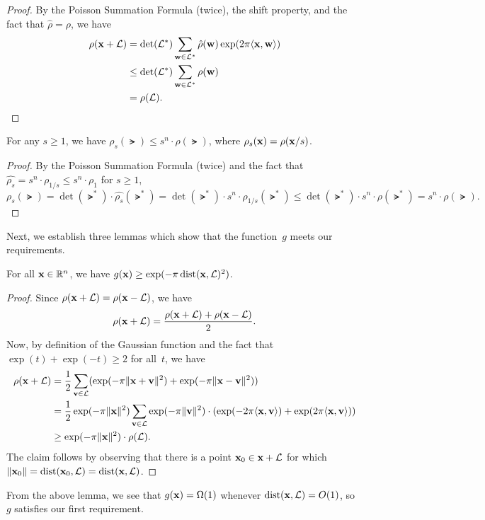 \documentclass[11pt]{article}
\begin{document}
\begin{proof}
  By the Poisson Summation Formula (twice), the shift property, and
  the fact that $\hat{\rho} = \rho$, we have
  \begin{align*}
    \rho(\mathbf{x} + \mathcal{L})
    &= \det(\mathcal{L}^*) \sum_{\mathbf{w} \in \mathcal{L}^*} \hat{\rho}(\mathbf{w})\exp(2 \pi \langle\mathbf{x},\mathbf{w}\rangle ) \\
    &\leq   \det(\mathcal{L}^*)\sum_{\mathbf{w} \in \mathcal{L}^*} \rho(\mathbf{w}) \\
    &=  \rho(\mathcal{L}).
  \end{align*}
\end{proof}

\begin{claim}
  \label{clm:gaussian-scale}
  For any $s \geq 1$, we have
  $\rho_s(\lat) \leq s^{n} \cdot \rho(\lat)$, where
  $\rho_s(\mathbf{x}) = \rho(\mathbf{x}/s)$.
\end{claim}

\begin{proof}
  By the Poisson Summation Formula (twice) and the fact that
  $\widehat{\rho_{s}} = s^{n} \cdot \rho_{1/s} \leq s^{n} \cdot
  \rho_{1}$ for $s \geq 1$,
  \[ \rho_s(\lat) = \det(\lat^*) \cdot \widehat{\rho_{s}}(\lat^*) =
    \det(\lat^{*}) \cdot s^{n} \cdot \rho_{1/s}(\lat^{*}) \leq
    \det(\lat^{*}) \cdot s^{n} \cdot \rho(\lat^{*}) = s^{n} \cdot
    \rho(\lat). \]
\end{proof}

\noindent Next, we establish three lemmas which show that the
function~$g$ meets our requirements.

\begin{lemma}
  For all $\mathbf{x} \in \mathbb{R}^{n}$, we have
  $g(\mathbf{x}) \geq \exp(-\pi \operatorname{dist}(\mathbf{x},\mathcal{L})^2)$.
\end{lemma}

\begin{proof}
  Since $\rho(\mathbf{x}+\mathcal{L}) = \rho(\mathbf{x}-\mathcal{L})$, we have
  \[ \rho(\mathbf{x}+\mathcal{L}) = \frac{\rho(\mathbf{x}+\mathcal{L}) +
      \rho(\mathbf{x}-\mathcal{L})}{2}. \] Now, by definition of the Gaussian
  function and the fact that $\exp(t) + \exp(-t) \geq 2$ for all~$t$,
  we have
  \begin{align*}
    \rho(\mathbf{x}+\mathcal{L})
    &= \frac12 \sum_{\mathbf{v} \in \mathcal{L}} ( \exp(-\pi \lVert\mathbf{x}+\mathbf{v}\rVert^2)+ \exp(-\pi \lVert\mathbf{x}-\mathbf{v}\rVert^2)) \\
    &= \frac12 \exp(-\pi \lVert\mathbf{x}\rVert^2)
      \sum_{\mathbf{v} \in \mathcal{L}} \exp(-\pi \lVert\mathbf{v}\rVert^2) \cdot
      (\exp(-2\pi \langle\mathbf{x},\mathbf{v}\rangle)+\exp(2\pi \langle\mathbf{x},\mathbf{v}\rangle)) \\
    &\geq \exp(-\pi \lVert\mathbf{x}\rVert^{2}) \cdot \rho(\mathcal{L}) .
  \end{align*}
  The claim follows by observing that there is a point
  $\mathbf{x}_0 \in \mathbf{x} + \mathcal{L}$ for which
  $\lVert\mathbf{x}_0\rVert=\operatorname{dist}(\mathbf{x}_0,\mathcal{L}) = \operatorname{dist}(\mathbf{x},\mathcal{L})$.
\end{proof}
From the above lemma, we see that $g(\mathbf{x}) = \Omega(1)$ whenever
$\operatorname{dist}(\mathbf{x},\mathcal{L}) = O(1)$, so~$g$ satisfies our first requirement.
\end{document}
